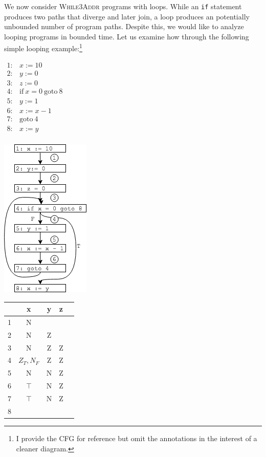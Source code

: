 \documentclass[11pt]{article}
\begin{document}
We now consider \textsc{While3Addr} programs with loops.  While an \texttt{if}
statement produces two paths that diverge and later join, a loop produces an
potentially unbounded number of program paths.  Despite this, we would like to
analyze looping programs in bounded time.  Let us examine how through the
following simple looping example:\footnote{I provide the CFG for reference but omit the annotations in the
interest of a cleaner diagram.}

\tablespace
\begin{center}
\begin{minipage}[t][-9.7em][b]{0.3\textwidth} %
$\begin{array}{ll}
1: & x := 10\\
2: & y := 0\\
3: & z := 0\\
4: & \mbox{if}~x=0~\mbox{goto}~8\\
5: & y := 1\\
6: & x := x - 1\\
7: & \mbox{goto}~4\\
8: & x := y\\
\end{array}$
\end{minipage}
\hspace*{1em}
\includegraphics[scale=0.8]{images/loop}
\hspace*{1em}
\begin{minipage}[t][-9.7em][b]{0.3\textwidth} %
\begin{tabular}{r | c c c l}
  & x & y & z \\
\hline
1 & N &   &   \\
2 & N & Z &   \\
3 & N & Z & Z \\
4 & $Z_T,N_F$ & Z & Z \\
5 & N & N & Z \\
6 & $\top$ & N & Z \\
7 & $\top$ & N & Z \\
8 &   &   &   \\
\end{tabular}
\end{minipage}
\end{center}
\tablespace
\end{document}
